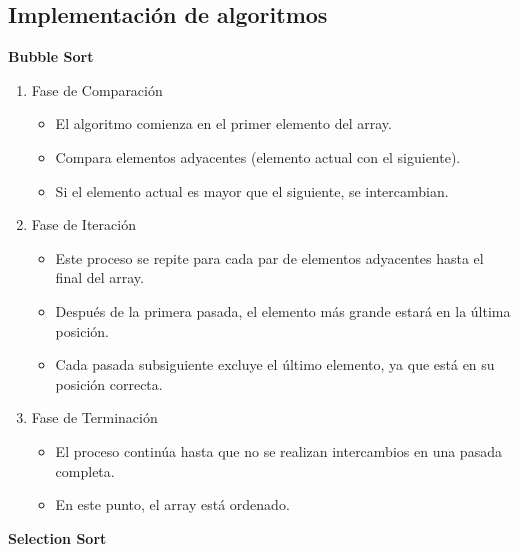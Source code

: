 \subsection{Implementación de algoritmos}
\textbf{
Bubble Sort
}
\begin{enumerate}
    \item Fase de Comparación
    \begin{itemize}
        \item El algoritmo comienza en el primer elemento del array.
        \item Compara elementos adyacentes (elemento actual con el siguiente).
        \item Si el elemento actual es mayor que el siguiente, se intercambian.
    \end{itemize}

    \item Fase de Iteración
    \begin{itemize}
        \item Este proceso se repite para cada par de elementos adyacentes hasta el final del array.
        \item Después de la primera pasada, el elemento más grande estará en la última posición.
        \item Cada pasada subsiguiente excluye el último elemento, ya que está en su posición correcta.
    \end{itemize}

    \item Fase de Terminación
    \begin{itemize}
        \item El proceso continúa hasta que no se realizan intercambios en una pasada completa.
        \item En este punto, el array está ordenado.
    \end{itemize}
\end{enumerate}
\textbf{
Selection Sort
}

